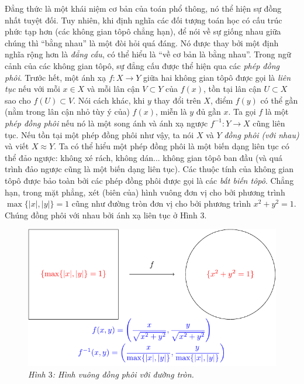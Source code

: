 \begin{multicols}{2}
	Đẳng thức là một khái niệm cơ bản của toán phổ thông, nó thể hiện sự đồng nhất tuyệt đối. Tuy nhiên, khi định nghĩa các đối tượng toán học có cấu trúc phức tạp hơn (các không gian tôpô chẳng hạn), để nói về sự giống nhau giữa chúng thì ``bằng nhau'' là một đòi hỏi quá đáng. Nó được thay bởi một định nghĩa rộng hơn là {\it đẳng cấu}, có thể hiểu là ``về cơ bản là bằng nhau''. Trong ngữ cảnh của các không gian tôpô, sự đẳng cấu được thể hiện qua các {\it phép đồng phôi}. Trước hết, một ánh xạ $f: X \to Y$ giữa hai không gian tôpô được gọi là {\it liên tục} nếu với mỗi $x \in X$ và mỗi lân cận $V \subset Y$ của $f(x)$, tồn tại lân cận $U \subset X$ sao cho $f(U) \subset V$. Nói cách khác, khi $y$ thay đổi trên $X$, điểm $f(y)$ có thể gần (nằm trong lân cận nhỏ tùy ý của) $f(x)$, miễn là $y$ đủ gần $x$. Ta gọi $f$ là một {\it phép đồng phôi} nếu nó là một song ánh và ánh xạ ngược $f^{-1}: Y \to X$ cũng liên tục. Nếu tồn tại một phép đồng phôi như vậy, ta nói $X$ và $Y$ {\it đồng phôi (với nhau)} và viết $X \approx Y$. Ta có thể hiểu một phép đồng phôi là một biến dạng liên tục có thể đảo ngược: không xé rách, không dán... không gian tôpô ban đầu (và quá trình đảo ngược cũng là một biến dạng liên tục). Các thuộc tính của không gian tôpô được bảo toàn bởi các phép đồng phôi được gọi là các {\it bất biến tôpô}.
	\vskip 0.1cm
	Chẳng hạn, trong mặt phẳng, xét (biên của) hình vuông đơn vị cho bởi phương trình $\max\{|x|,|y|\} = 1$ cũng như đường tròn đơn vị cho bởi phương trình $x^2 + y^2 = 1$. Chúng đồng phôi với nhau bởi ánh xạ liên tục ở Hình $3$.
	\begin{figure}[H]
		\vspace*{-5pt}
		\centering\captionsetup{labelformat=empty, justification=centering}
		\includegraphics[width=1\linewidth]{H3.pdf}
		\caption{\small\textit{\color{duongvaotoanhoc}Hình $3$: Hình vuông đồng phôi với đường tròn.}}

\end{figure}
\end{multicols}
